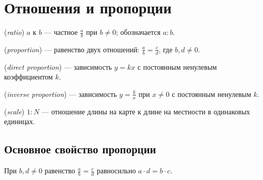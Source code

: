 \chapter{Отношения и пропорции}\label{chap:c05}
\begin{definition} (\emph{ratio}) \(a\) к \(b\) — частное \(\frac{a}{b}\) при \(b \ne  0\); обозначается \(a : b\).\end{definition}
\begin{definition} (\emph{proportion}) — равенство двух отношений: \(\frac{a}{b} = \frac{c}{d}\), где \(b,\allowbreak d \ne  0\).\end{definition}
\begin{definition} (\emph{direct proportion}) — зависимость \(y = kx\) с постоянным ненулевым коэффициентом \(k\).\end{definition}
\begin{definition} (\emph{inverse proportion}) — зависимость \(y = \frac{k}{x}\) при \(x \ne  0\) с постоянным ненулевым \(k\).\end{definition}
\begin{definition} (\emph{scale}) \(1 : N\) — отношение длины на карте к длине на местности в одинаковых единицах.\end{definition}
\section{Основное свойство пропорции}
При \(b,\allowbreak d \ne  0\) равенство \(\frac{a}{b} = \frac{c}{d}\) равносильно \(a \cdot  d = b \cdot  c\).\par
